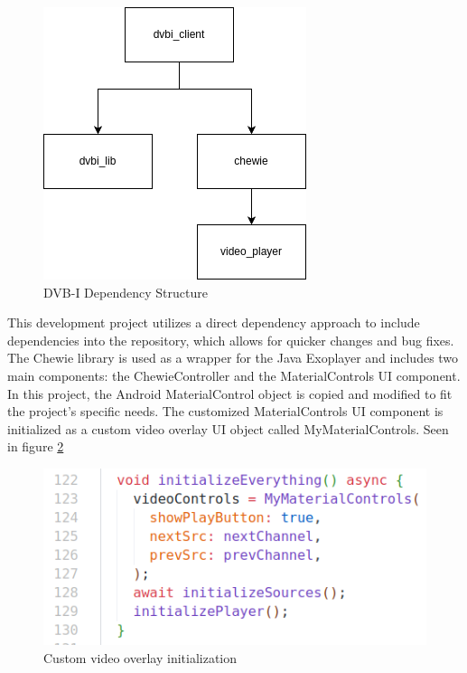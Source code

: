 \documentclass[conference]{IEEEtran}
\begin{document}
\begin{figure}[ht]
	\centerline{\includegraphics[width=\linewidth]{figures/dvbi_dir_structure}}
	\caption{DVB-I Dependency Structure}
	\label{fig:dvbi_dir_structure}
\end{figure}



This development project utilizes a direct dependency approach to include dependencies into the repository, which allows for quicker changes and bug fixes. The Chewie library is used as a wrapper for the Java Exoplayer and includes two main components: the ChewieController and the MaterialControls UI component. In this project, the Android MaterialControl object is copied and modified to fit the project's specific needs. The customized MaterialControls UI component is initialized as a custom video overlay UI object called MyMaterialControls. Seen in figure \ref{fig:mymaterialcontrols}


\begin{figure}[ht]
	\centerline{\includegraphics[width=\linewidth]{figures/MyMaterialControls}}
	\caption{Custom video overlay initialization}
	\label{fig:mymaterialcontrols}
\end{figure}
\end{document}
